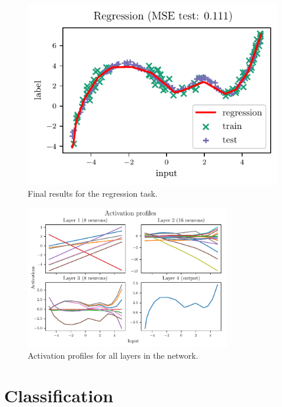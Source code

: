 \documentclass[11pt,a4paper]{scrartcl}
\begin{document}
\begin{figure}[H]
    \centering
    \includegraphics{../01_Regression/Plots/results.pdf}
    \caption{Final results for the regression task.\label{fig:regression_results}}
\end{figure}

\begin{figure}[H]
    \centering
    \includegraphics[width=0.8\textwidth]{../01_Regression/Plots/regression_profiles}
    \caption{Activation profiles for all layers in the network.\label{fig:regression_profiles}}
\end{figure}





\section{Classification \label{sec:classification}}
\end{document}
